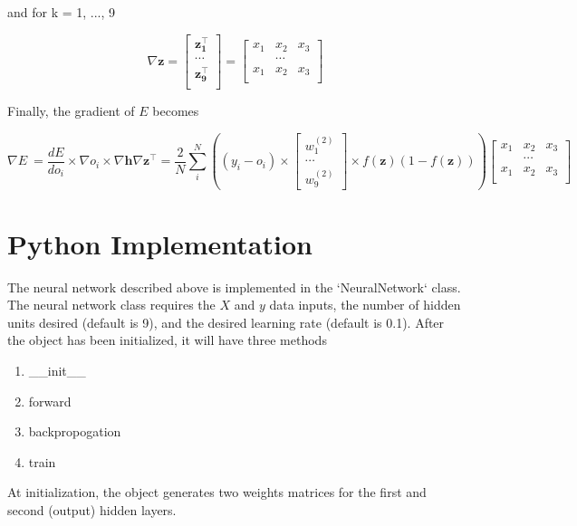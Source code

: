 \documentclass[12pt]{article}%
\begin{document}
and for k = 1, ..., 9


	$$
	\nabla \mathbf{z} = 
	\begin{bmatrix}
	\mathbf{z^\intercal_1} \\
	\cdots \\
	\mathbf{z^\intercal_9} \\
	\end{bmatrix}
	=  \begin{bmatrix}
	x_1 & x_2 & x_3 \\
	 & \cdots & \\
	x_1 & x_2 & x_3 \\
	\end{bmatrix}
	$$


Finally, the gradient of $E$ becomes

	$$
	\nabla E \ = \frac{dE}{do_i} \times \nabla o_i \times \nabla \mathbf{h} \nabla \mathbf{z}^\intercal = \frac{2}{N}  \sum^N_{i}  \left( (y_i - o_i) \times 
	\begin{bmatrix}
	w^{(2)}_1 \\
	\cdots \\
	w^{(2)}_9
	\end{bmatrix} \times 
	f(\mathbf{z}) (1 - f(\mathbf{z})) \right)
	\begin{bmatrix}
	x_1 & x_2 & x_3 \\
	 & \cdots & \\
	x_1 & x_2 & x_3 \\
	\end{bmatrix}	
	$$


\section{Python Implementation}


The neural network described above is implemented in the `NeuralNetwork` class. The neural network class requires the $X$ and $y$ data inputs, the number of hidden units desired (default is 9), and the desired learning rate (default is 0.1). After the object has been initialized, it will have three methods

\begin{enumerate}
\item \_\_init\_\_
\item forward
\item backpropogation
\item train
\end{enumerate}

	At initialization, the object generates two weights matrices for the first and second (output) hidden layers.
\end{document}
